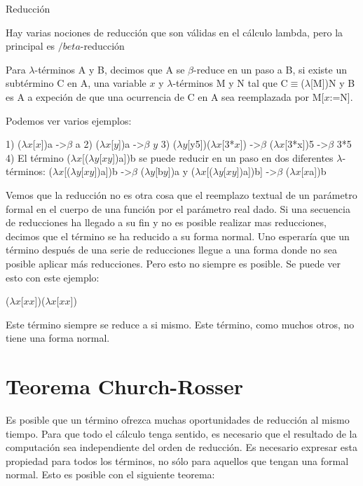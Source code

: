 Reducción

Hay varias nociones de reducción que son válidas en el cálculo lambda, pero la principal es $/beta$-reducción

\begin{definition}
  Para $\lambda$-términos A y B, decimos que A se $\beta$-reduce en un paso a B, si existe un subtérmino C en A, una variable $x$ y $\lambda$-términos M y N tal que C$\equiv$($\lambda$[M])N y B es A a expeción de que una ocurrencia de C en A sea reemplazada por M[$x$:=N].
\end{definition}

Podemos ver varios ejemplos:

1) ($\lambda$$x$[$x$])a ->$\beta$ a
2) ($\lambda$$x$[$y$])a ->$\beta$ $y$
3) ($\lambda$$y$[y5])($\lambda$$x$[3*$x$]) ->$\beta$ ($\lambda$$x$[3*x])5 ->$\beta$ 3*5
4) El término ($\lambda$$x$[($\lambda$$y$[$x$$y$])a])b se puede reducir en un paso en dos diferentes $\lambda$-términos:
($\lambda$$x$[($\lambda$$y$[$x$$y$])a])b ->$\beta$ ($\lambda$$y$[b$y$])a
y
($\lambda$$x$[($\lambda$$y$[$x$$y$])a])b] ->$\beta$ ($\lambda$$x$[$x$a])b

Vemos que la reducción no es otra cosa que el reemplazo textual de un parámetro formal en el cuerpo de una función por el parámetro real dado. Si una secuencia de reducciones ha llegado a su fin y no es posible realizar mas reducciones, decimos que el término se ha reducido a su forma normal.
Uno esperaría que un término después de una serie de reducciones llegue a una forma donde no sea posible aplicar más reducciones. Pero esto no siempre es posible. Se puede ver esto con este ejemplo:

($\lambda$$x$[$x$$x$])($\lambda$$x$[$x$$x$])

Este término siempre se reduce a si mismo. Este término, como muchos otros, no tiene una forma normal.

\section{Teorema Church-Rosser}

Es posible que un término ofrezca muchas oportunidades de reducción al mismo tiempo. Para que todo el cálculo tenga sentido, es necesario que el resultado de la computación sea independiente del orden de reducción. Es necesario expresar esta propiedad para todos los términos, no sólo para aquellos que tengan una formal normal. Esto es posible con el siguiente teorema:

